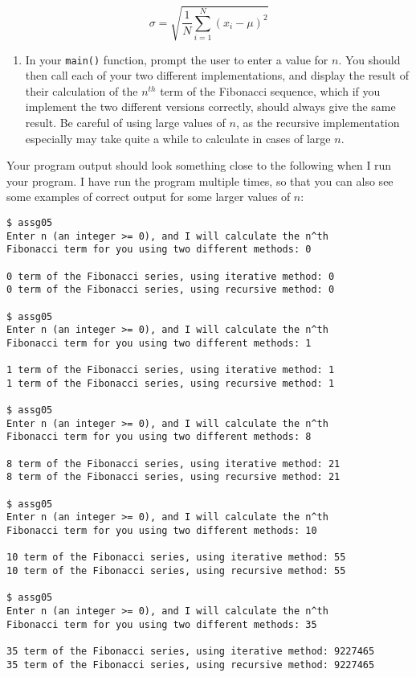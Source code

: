 \documentclass[11pt]{article}
\begin{document}
$$
\sigma = \sqrt{\frac{1}{N} \sum_{i=1}^N (x_i - \mu)^2}
$$

\begin{enumerate}
\item In your \verb~main()~ function, prompt the user to enter a value for $n$.
You should then call each of your two different implementations, and
display the result of their calculation of the $n^{th}$ term of the
Fibonacci sequence, which if you implement the two different versions
correctly, should always give the same result.  Be careful of using
large values of $n$, as the recursive implementation especially may
take quite a while to calculate in cases of large $n$.
\end{enumerate}

Your program output should look something close to the following when I
run your program.  I have run the program multiple times, so that you
can also see some examples of correct output for some larger values
of $n$:

\begin{verbatim}
$ assg05
Enter n (an integer >= 0), and I will calculate the n^th
Fibonacci term for you using two different methods: 0

0 term of the Fibonacci series, using iterative method: 0
0 term of the Fibonacci series, using recursive method: 0

$ assg05
Enter n (an integer >= 0), and I will calculate the n^th
Fibonacci term for you using two different methods: 1

1 term of the Fibonacci series, using iterative method: 1
1 term of the Fibonacci series, using recursive method: 1

$ assg05
Enter n (an integer >= 0), and I will calculate the n^th
Fibonacci term for you using two different methods: 8

8 term of the Fibonacci series, using iterative method: 21
8 term of the Fibonacci series, using recursive method: 21

$ assg05
Enter n (an integer >= 0), and I will calculate the n^th
Fibonacci term for you using two different methods: 10

10 term of the Fibonacci series, using iterative method: 55
10 term of the Fibonacci series, using recursive method: 55

$ assg05
Enter n (an integer >= 0), and I will calculate the n^th
Fibonacci term for you using two different methods: 35

35 term of the Fibonacci series, using iterative method: 9227465
35 term of the Fibonacci series, using recursive method: 9227465
\end{verbatim}
\end{document}
